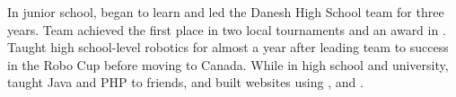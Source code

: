 

\begin{cvparagraph}

In junior school, began to learn  and led the Danesh High School team for three years. Team achieved the first place in two local tournaments and an award in . Taught high school-level robotics for almost a year after leading team to success in the Robo Cup before moving to Canada. While in high school and university, taught Java and PHP to friends, and built websites using ,  and .
\end{cvparagraph}